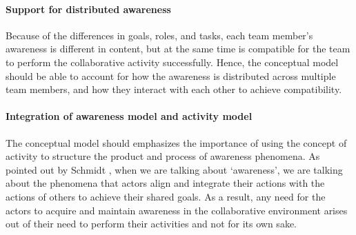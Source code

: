 \paragraph*{Support for distributed awareness} %
\label{par:the_distributed_nature_of_awareness}
Because of the differences in goals, roles, and tasks, each team member's awareness is different in content, but at the same time is compatible for the team to perform the collaborative activity successfully. Hence, the conceptual model should be able to account for how the awareness is distributed across multiple team members, and how they interact with each other to achieve compatibility. 

\paragraph*{Integration of awareness model and activity model} %
\label{par:the_coupling_between_awareness_and_activity}
The conceptual model should emphasizes the importance of using the concept of activity to structure the product and process of awareness phenomena. As pointed out by Schmidt \cite{schmidt2002a}, when we are talking about `awareness', we are talking about the phenomena that actors align and integrate their actions with the actions of others to achieve their shared goals. As a result, any need for the actors to acquire and maintain awareness in the collaborative environment arises out of their need to perform their activities and not for its own sake.


